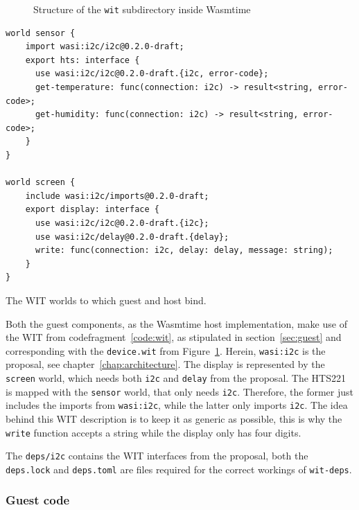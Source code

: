 \begin{figure}[h]
\caption{Structure of the \texttt{wit} subdirectory inside Wasmtime}
\label{fig:wit:dirtree}
\end{figure}

\begin{listing}[h!]

\begin{verbatim}
world sensor {
    import wasi:i2c/i2c@0.2.0-draft;
    export hts: interface {
      use wasi:i2c/i2c@0.2.0-draft.{i2c, error-code};
      get-temperature: func(connection: i2c) -> result<string, error-code>;
      get-humidity: func(connection: i2c) -> result<string, error-code>;
    }
}

world screen {
    include wasi:i2c/imports@0.2.0-draft;
    export display: interface {
      use wasi:i2c/i2c@0.2.0-draft.{i2c};
      use wasi:i2c/delay@0.2.0-draft.{delay};
      write: func(connection: i2c, delay: delay, message: string);
    }
}
\end{verbatim}
\caption{The \gls{WIT} worlds to which guest and host bind.}
\label{code:wit}
\end{listing}

Both the guest components, as the Wasmtime host implementation, make use of the \gls{WIT} from codefragment~\ref{code:wit}, as stipulated in section~\ref{sec:guest} and corresponding with the \texttt{device.wit} from Figure~\ref{fig:wit:dirtree}. Herein, \texttt{wasi:i2c} is the proposal, see chapter~\ref{chap:architecture}. The display is represented by the \texttt{screen} world, which needs both \texttt{i2c} and \texttt{delay} from the proposal. The HTS221 is mapped with the \texttt{sensor} world, that only needs \texttt{i2c}. Therefore, the former just includes the imports from \texttt{wasi:i2c}, while the latter only imports \texttt{i2c}. The idea behind this WIT description is to keep it as generic as possible, this is why the \texttt{write} function accepts a string while the display only has four digits.

The \texttt{deps/i2c} contains the WIT interfaces from the proposal, both the \texttt{deps.lock} and \texttt{deps.toml} are files required for the correct workings of \texttt{wit-deps}.

\subsubsection{Guest code}

